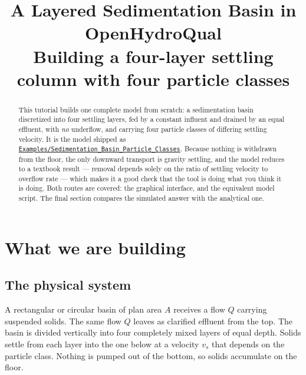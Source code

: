 \documentclass[11pt,a4paper]{article}
\title{\textbf{A Layered Sedimentation Basin in OpenHydroQual}\\[0.3em]
       \large Building a four-layer settling column with four particle classes}
\author{}
\date{}
\newcommand{\file}[1]{\texttt{\small #1}}
\newcommand{\ghtree}{https://github.com/ArashMassoudieh/OpenHydroQual/tree/master}
\newcommand{\exdir}[1]{\href{\ghtree/#1}{\file{#1}}}
\begin{document}
\maketitle
\vspace{-2.5em}

\begin{abstract}
\noindent
This tutorial builds one complete model from scratch: a sedimentation basin
discretized into four settling layers, fed by a constant influent and drained by
an equal effluent, with \emph{no} underflow, and carrying four particle classes
of differing settling velocity. It is the model shipped as
\exdir{Examples/Sedimentation\_Basin\_Particle\_Classes}. Because nothing is
withdrawn from the floor, the only downward transport is gravity settling, and
the model reduces to a textbook result --- removal depends solely on the ratio
of settling velocity to overflow rate --- which makes it a good check that the
tool is doing what you think it is doing. Both routes are covered: the
graphical interface, and the equivalent model script. The final section compares
the simulated answer with the analytical one.
\end{abstract}

\tableofcontents

\section{What we are building}

\subsection{The physical system}

A rectangular or circular basin of plan area $A$ receives a flow $Q$ carrying
suspended solids. The same flow $Q$ leaves as clarified effluent from the top.
The basin is divided vertically into four completely mixed layers of equal
depth. Solids settle from each layer into the one below at a velocity $v_s$ that
depends on the particle class. Nothing is pumped out of the bottom, so solids
accumulate on the floor.
\end{document}
